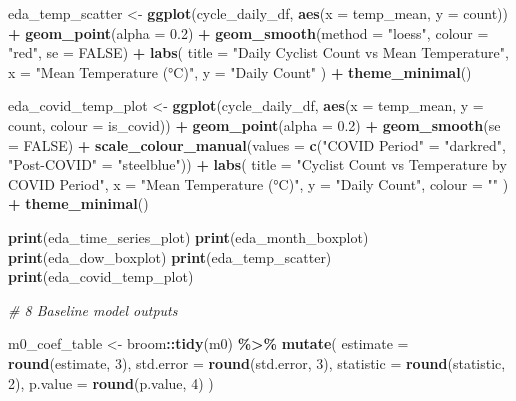 \documentclass[
]{article}
\newenvironment{Shaded}{\begin{snugshade}}{\end{snugshade}}
\newcommand{\AttributeTok}[1]{\textcolor[rgb]{0.13,0.29,0.53}{#1}}
\newcommand{\CommentTok}[1]{\textcolor[rgb]{0.56,0.35,0.01}{\textit{#1}}}
\newcommand{\ConstantTok}[1]{\textcolor[rgb]{0.56,0.35,0.01}{#1}}
\newcommand{\DecValTok}[1]{\textcolor[rgb]{0.00,0.00,0.81}{#1}}
\newcommand{\FloatTok}[1]{\textcolor[rgb]{0.00,0.00,0.81}{#1}}
\newcommand{\FunctionTok}[1]{\textcolor[rgb]{0.13,0.29,0.53}{\textbf{#1}}}
\newcommand{\NormalTok}[1]{#1}
\newcommand{\OtherTok}[1]{\textcolor[rgb]{0.56,0.35,0.01}{#1}}
\newcommand{\SpecialCharTok}[1]{\textcolor[rgb]{0.81,0.36,0.00}{\textbf{#1}}}
\newcommand{\StringTok}[1]{\textcolor[rgb]{0.31,0.60,0.02}{#1}}
\begin{document}
\begin{Shaded}
\begin{Highlighting}[]
\NormalTok{eda\_temp\_scatter }\OtherTok{\textless{}{-}} \FunctionTok{ggplot}\NormalTok{(cycle\_daily\_df, }\FunctionTok{aes}\NormalTok{(}\AttributeTok{x =}\NormalTok{ temp\_mean, }\AttributeTok{y =}\NormalTok{ count)) }\SpecialCharTok{+}
  \FunctionTok{geom\_point}\NormalTok{(}\AttributeTok{alpha =} \FloatTok{0.2}\NormalTok{) }\SpecialCharTok{+}
  \FunctionTok{geom\_smooth}\NormalTok{(}\AttributeTok{method =} \StringTok{"loess"}\NormalTok{, }\AttributeTok{colour =} \StringTok{"red"}\NormalTok{, }\AttributeTok{se =} \ConstantTok{FALSE}\NormalTok{) }\SpecialCharTok{+}
  \FunctionTok{labs}\NormalTok{(}
    \AttributeTok{title =} \StringTok{"Daily Cyclist Count vs Mean Temperature"}\NormalTok{,}
    \AttributeTok{x =} \StringTok{"Mean Temperature (°C)"}\NormalTok{,}
    \AttributeTok{y =} \StringTok{"Daily Count"}
\NormalTok{  ) }\SpecialCharTok{+}
  \FunctionTok{theme\_minimal}\NormalTok{()}

\NormalTok{eda\_covid\_temp\_plot }\OtherTok{\textless{}{-}} \FunctionTok{ggplot}\NormalTok{(cycle\_daily\_df, }\FunctionTok{aes}\NormalTok{(}\AttributeTok{x =}\NormalTok{ temp\_mean, }\AttributeTok{y =}\NormalTok{ count, }\AttributeTok{colour =}\NormalTok{ is\_covid)) }\SpecialCharTok{+}
  \FunctionTok{geom\_point}\NormalTok{(}\AttributeTok{alpha =} \FloatTok{0.2}\NormalTok{) }\SpecialCharTok{+}
  \FunctionTok{geom\_smooth}\NormalTok{(}\AttributeTok{se =} \ConstantTok{FALSE}\NormalTok{) }\SpecialCharTok{+}
  \FunctionTok{scale\_colour\_manual}\NormalTok{(}\AttributeTok{values =} \FunctionTok{c}\NormalTok{(}\StringTok{"COVID Period"} \OtherTok{=} \StringTok{"darkred"}\NormalTok{,}
                                 \StringTok{"Post{-}COVID"} \OtherTok{=} \StringTok{"steelblue"}\NormalTok{)) }\SpecialCharTok{+}
  \FunctionTok{labs}\NormalTok{(}
    \AttributeTok{title =} \StringTok{"Cyclist Count vs Temperature by COVID Period"}\NormalTok{,}
    \AttributeTok{x =} \StringTok{"Mean Temperature (°C)"}\NormalTok{,}
    \AttributeTok{y =} \StringTok{"Daily Count"}\NormalTok{,}
    \AttributeTok{colour =} \StringTok{""}
\NormalTok{  ) }\SpecialCharTok{+}
  \FunctionTok{theme\_minimal}\NormalTok{()}

\FunctionTok{print}\NormalTok{(eda\_time\_series\_plot)}
\FunctionTok{print}\NormalTok{(eda\_month\_boxplot)}
\FunctionTok{print}\NormalTok{(eda\_dow\_boxplot)}
\FunctionTok{print}\NormalTok{(eda\_temp\_scatter)}
\FunctionTok{print}\NormalTok{(eda\_covid\_temp\_plot)}

\CommentTok{\# 8 Baseline model outputs}

\NormalTok{m0\_coef\_table }\OtherTok{\textless{}{-}}\NormalTok{ broom}\SpecialCharTok{::}\FunctionTok{tidy}\NormalTok{(m0) }\SpecialCharTok{\%\textgreater{}\%}
  \FunctionTok{mutate}\NormalTok{(}
    \AttributeTok{estimate =} \FunctionTok{round}\NormalTok{(estimate, }\DecValTok{3}\NormalTok{),}
    \AttributeTok{std.error =} \FunctionTok{round}\NormalTok{(std.error, }\DecValTok{3}\NormalTok{),}
    \AttributeTok{statistic =} \FunctionTok{round}\NormalTok{(statistic, }\DecValTok{2}\NormalTok{),}
    \AttributeTok{p.value =} \FunctionTok{round}\NormalTok{(p.value, }\DecValTok{4}\NormalTok{)}
\NormalTok{  )}


\end{Highlighting}
\end{Shaded}
\end{document}
